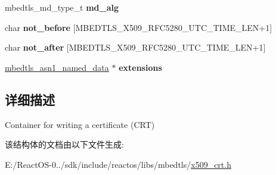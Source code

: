 \begin{DoxyCompactItemize}
mbedtls\+\_\+md\+\_\+type\+\_\+t {\bfseries md\+\_\+alg}
\item 
\mbox{\label{structmbedtls__x509write__cert_ad6949fe534892489aae6120930608674}} 
char {\bfseries not\+\_\+before} \mbox{[}M\+B\+E\+D\+T\+L\+S\+\_\+\+X509\+\_\+\+R\+F\+C5280\+\_\+\+U\+T\+C\+\_\+\+T\+I\+M\+E\+\_\+\+L\+EN+1\mbox{]}
\item 
\mbox{\label{structmbedtls__x509write__cert_a6cd1ad303fa276aa04f9ff3eac02cc99}} 
char {\bfseries not\+\_\+after} \mbox{[}M\+B\+E\+D\+T\+L\+S\+\_\+\+X509\+\_\+\+R\+F\+C5280\+\_\+\+U\+T\+C\+\_\+\+T\+I\+M\+E\+\_\+\+L\+EN+1\mbox{]}
\item 
\mbox{\label{structmbedtls__x509write__cert_aca0adbd990adfc83ebb27b7333590a5c}} 
\hyperlink{structmbedtls__asn1__named__data}{mbedtls\+\_\+asn1\+\_\+named\+\_\+data} $\ast$ {\bfseries extensions}
\end{DoxyCompactItemize}


\subsection{详细描述}
Container for writing a certificate (C\+RT) 

该结构体的文档由以下文件生成\+:\begin{DoxyCompactItemize}
\item 
E\+:/\+React\+O\+S-\/0../sdk/include/reactos/libs/mbedtls/\hyperlink{x509__crt_8h}{x509\+\_\+crt.\+h}\end{DoxyCompactItemize}
